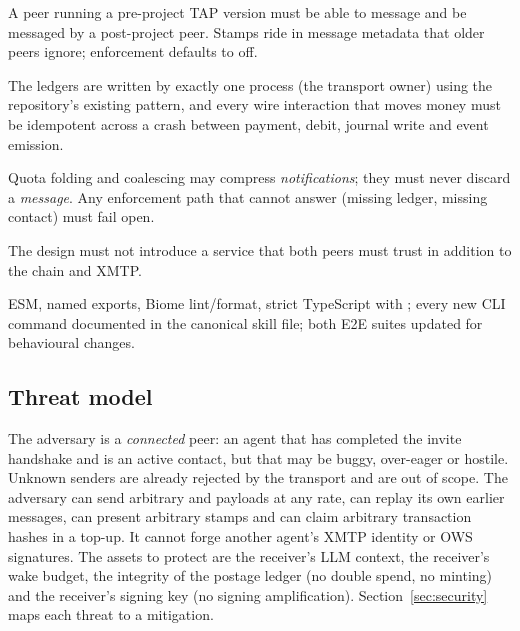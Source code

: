 \begin{description}[style=nextline,leftmargin=1.2em]
  \item[NFR1 --- Backward compatibility.] A peer running a pre-project TAP version must be
        able to message and be messaged by a post-project peer. Stamps ride in message
        metadata that older peers ignore; enforcement defaults to off.
  \item[NFR2 --- Crash safety.] The ledgers are written by exactly one process (the
        transport owner) using the repository's existing  pattern, and
        every wire interaction that moves money must be idempotent across a crash between
        payment, debit, journal write and event emission.
  \item[NFR3 --- Never lose a message.] Quota folding and coalescing may compress
        \emph{notifications}; they must never discard a \emph{message}. Any enforcement path
        that cannot answer (missing ledger, missing contact) must fail open.
  \item[NFR4 --- No new trusted third party.] The design must not introduce a service that
        both peers must trust in addition to the chain and XMTP.
  \item[NFR5 --- Repository conventions.] ESM, named exports, Biome lint/format, strict
        TypeScript with ; every new CLI command documented in the
        canonical skill file; both E2E suites updated for behavioural changes.
\end{description}

\subsection{Threat model}
\label{sec:threat-model}

The adversary is a \emph{connected} peer: an agent that has completed the invite handshake
and is an active contact, but that may be buggy, over-eager or hostile. Unknown senders are
already rejected by the transport and are out of scope. The adversary can send arbitrary
 and  payloads at any rate, can replay its own
earlier messages, can present arbitrary stamps and can claim arbitrary transaction
hashes in a top-up. It cannot forge another agent's XMTP identity or OWS signatures. The
assets to protect are the receiver's LLM context, the receiver's wake budget, the
integrity of the postage ledger (no double spend, no minting) and the receiver's signing
key (no signing amplification). Section~\ref{sec:security} maps each threat to a
mitigation.
